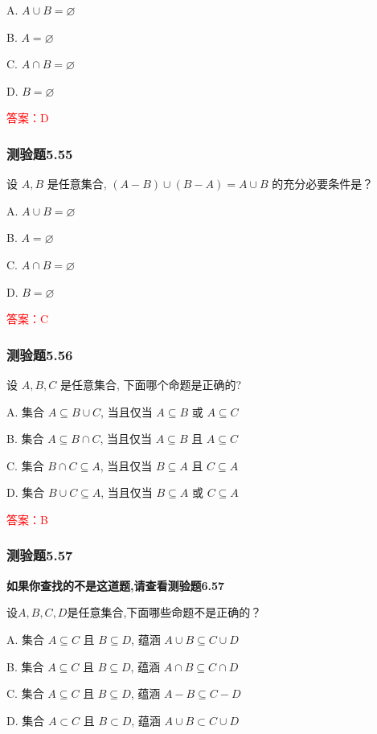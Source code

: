 \documentclass[UTF8, heading=true]{ctexart}
\begin{document}
A. $A \cup B=\varnothing$

B. $A=\varnothing$

C. $A \cap B=\varnothing$

D. $B=\varnothing$

\textcolor{red}{答案：D}

\subsubsection{测验题5.55}
设 $A, B$ 是任意集合, $(A-B) \cup(B-A)=A \cup B$ 的充分必要条件是？

A. $A \cup B=\varnothing$

B. $A=\varnothing$

C. $A \cap B=\varnothing$

D. $B=\varnothing$

\textcolor{red}{答案：C}

\subsubsection{测验题5.56}

设 $A, B, C$ 是任意集合, 下面哪个命题是正确的?

A. 集合 $A \subseteq B \cup C$, 当且仅当 $A \subseteq B$ 或 $A \subseteq C$

B. 集合 $A \subseteq B \cap C$, 当且仅当 $A \subseteq B$ 且 $A \subseteq C$

C. 集合 $B \cap C \subseteq A$, 当且仅当 $B \subseteq A$ 且 $C \subseteq A$

D. 集合 $B \cup C \subseteq A$, 当且仅当 $B \subseteq A$ 或 $C \subseteq A$

\textcolor{red}{答案：B}



\subsubsection{测验题5.57}

\textbf{如果你查找的不是这道题,请查看测验题6.57}

设$A, B, C, D$是任意集合,下面哪些命题不是正确的？

A. 集合 $A \subseteq C$ 且 $B \subseteq D$, 蕴涵 $A \cup B \subseteq C \cup D$

B. 集合 $A \subseteq C$ 且 $B \subseteq D$, 蕴涵 $A \cap B \subseteq C \cap D$

C. 集合 $A \subseteq C$ 且 $B \subseteq D$, 蕴涵 $A-B \subseteq C-D$

D. 集合 $A \subset C$ 且 $B \subset D$, 蕴涵 $A \cup B \subset C \cup D$
\end{document}
